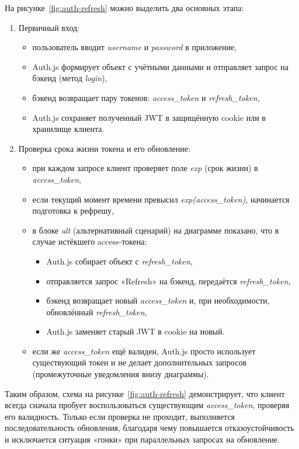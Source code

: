 На рисунке~\ref{fig:auth-refresh} можно выделить два основных этапа:
\begin{enumerate}
    \item Первичный вход:
    \begin{itemize}
        \item пользователь вводит \textit{username} и \textit{password} в приложение,
        \item Auth.js формирует объект с учётными данными и отправляет запрос на бэкенд (метод \textit{login}),
        \item бэкенд возвращает пару токенов: \textit{access\_token} и \textit{refresh\_token},
        \item Auth.js сохраняет полученный JWT в защищённую cookie или в хранилище клиента.
    \end{itemize}
    \item Проверка срока жизни токена и его обновление:
    \begin{itemize}
        \item при каждом запросе клиент проверяет поле \textit{exp} (срок жизни) в \textit{access\_token},
        \item если текущий момент времени превысил \textit{exp(access\_token)}, начинается подготовка к рефрешу,
        \item в блоке \textit{alt} (альтернативный сценарий) на диаграмме показано, что в случае истёкшего access-токена:
        \begin{itemize}
            \item Auth.js собирает объект с \textit{refresh\_token},
            \item отправляется запрос «Refresh» на бэкенд, передаётся \textit{refresh\_token},
            \item бэкенд возвращает новый \textit{access\_token} и, при необходимости, обновлённый \textit{refresh\_token},
            \item Auth.js заменяет старый JWT в cookie на новый.
        \end{itemize}
        \item если же \textit{access\_token} ещё валиден, Auth.js просто использует существующий токен и не делает дополнительных запросов (промежуточные уведомления внизу диаграммы).
    \end{itemize}
\end{enumerate}

Таким образом, схема на рисунке~\ref{fig:auth-refresh} демонстрирует, что клиент всегда сначала пробует воспользоваться существующим \textit{access\_token}, проверяя его валидность. Только если проверка не проходит, выполняется последовательность обновления, благодаря чему повышается отказоустойчивость и исключается ситуация «гонки» при параллельных запросах на обновление.

